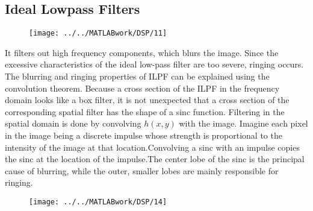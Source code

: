 \documentclass[12pt,a4paper]{article}
\begin{document}
\subsection{Ideal Lowpass Filters}
\begin{figure}[ht]
	\begin{center}
		\texttt{[image: ../../MATLABwork/DSP/11]}
	\end{center}
\end{figure}

It filters out high frequency components, which blurs the image. Since the excessive characteristics of the ideal low-pass filter are too severe, ringing occurs.\\

The blurring and ringing properties of ILPF can be explained using the
convolution theorem. Because a cross section of the ILPF in the frequency domain looks like a box filter, it is not unexpected that a cross section of
the corresponding spatial filter has the shape of a sinc function. Filtering in the
spatial domain is done by convolving $h(x,y)$ with the image. Imagine each pixel
in the image being a discrete impulse whose strength is proportional to the intensity of the image at that location.Convolving a sinc with an impulse copies the sinc at the location of the impulse.The center lobe of the sinc is the principal cause of blurring, while the outer, smaller lobes are mainly responsible for ringing.
\begin{figure}[ht]
	\begin{center}
		\texttt{[image: ../../MATLABwork/DSP/14]}
	\end{center}
\end{figure}
\end{document}
